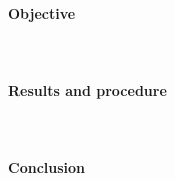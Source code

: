 \paragraph*{Objective} \hfill \\

\paragraph*{Results and procedure} \hfill\\

\paragraph*{Conclusion} \hfill \\